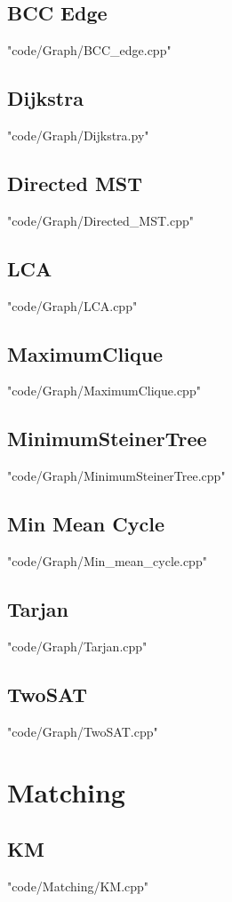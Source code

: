 \subsection{BCC Edge}
 {"code/Graph/BCC_edge.cpp"}
\subsection{Dijkstra}
 {"code/Graph/Dijkstra.py"}
\subsection{Directed MST}
 {"code/Graph/Directed_MST.cpp"}
\subsection{LCA}
 {"code/Graph/LCA.cpp"}
\subsection{MaximumClique}
 {"code/Graph/MaximumClique.cpp"}
\subsection{MinimumSteinerTree}
 {"code/Graph/MinimumSteinerTree.cpp"}
\subsection{Min Mean Cycle}
 {"code/Graph/Min_mean_cycle.cpp"}
\subsection{Tarjan}
 {"code/Graph/Tarjan.cpp"}
\subsection{TwoSAT}
 {"code/Graph/TwoSAT.cpp"}
\section{Matching}
\subsection{KM}
 {"code/Matching/KM.cpp"}
